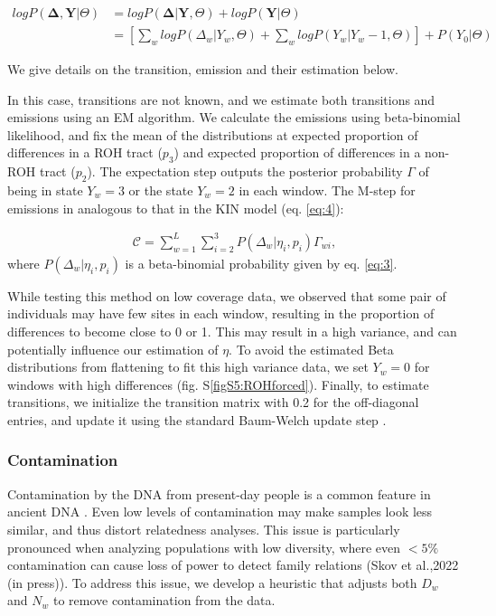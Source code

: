 \documentclass[12pt, letterpaper]{article}
\begin{document}
\begin{align}\label{eq:10}
    log P(\mathbf{\Delta},\mathbf{Y}|\Theta) &= log P(\mathbf{\Delta}|\mathbf{Y},\Theta) + log P(\mathbf{Y}|\Theta)\nonumber\\
 &= [\sum_{w} log P(\Delta_w|Y_w, \Theta) + \sum_{w} log P(Y_w|Y_w-1, \Theta)] + P(Y_0| \Theta)
\end{align}

We give details on the transition, emission and their estimation below.

In this case, transitions are not known, and we estimate both transitions and emissions using an EM algorithm. We calculate the emissions using beta-binomial likelihood, and fix the mean of the distributions at expected proportion of differences in a ROH tract ($p_3$) and expected proportion of differences in a non-ROH tract ($p_2$). The expectation step outputs the posterior probability $\Gamma$ of being in state $Y_w=3$ or the state $Y_w=2$ in each window. The M-step for emissions in analogous to that in the KIN model (eq. \ref{eq:4}):

\begin{align}\label{eq:11}
\mathcal{C} = \sum_{w=1}^L \sum_{i=2}^3 P(\Delta_w|\eta_{i},p_{i}) \Gamma_{wi} ,
\end{align}
where $P(\Delta_w|\eta_{i},p_{i})$ is a beta-binomial probability given by eq. \ref{eq:3}.

While testing this method on low coverage data, we observed that some pair of individuals may have few sites in each window, resulting in the proportion of differences to become close to 0 or 1. This may result in a high variance, and can potentially influence our estimation of $\eta$. To avoid the estimated Beta distributions from flattening to fit this high variance data, we set $Y_w=0$ for windows with high differences (fig. S\ref{figS5:ROHforced}). Finally, to estimate transitions, we initialize the transition matrix with 0.2 for the off-diagonal entries, and update it using the standard Baum-Welch update step \cite{baum_maximization_1970}. 

\subsubsection{Contamination}
Contamination by the DNA from present-day people is a common feature in ancient DNA \cite{peyregne_present-day_2020}. Even low levels of contamination may make samples look less similar, and thus distort relatedness analyses. This issue is particularly pronounced  when analyzing populations with low diversity, where even $<5\%$ contamination can cause loss of power to detect family relations (Skov et al.,2022 (in press)). To address this issue, we develop a heuristic that adjusts both $D_w$ and $N_w$ to remove contamination from the data.
\end{document}
